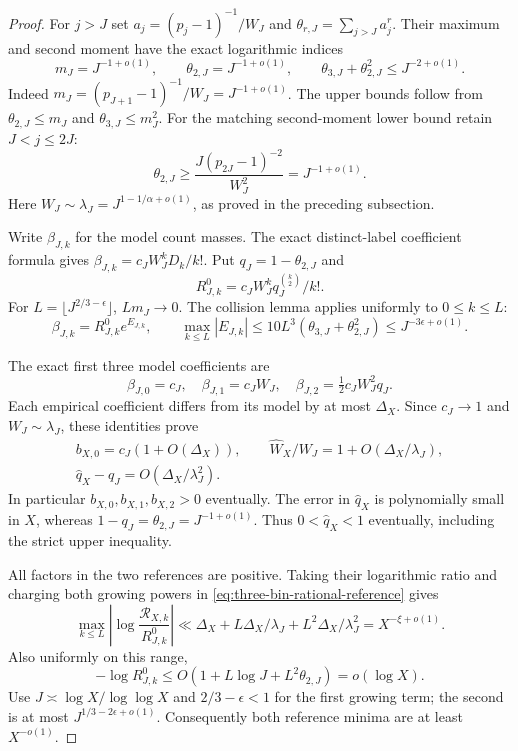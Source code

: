 \documentclass[11pt]{article}
\theoremstyle{definition}
\begin{document}
\begin{proof}
For $j>J$ set
$a_j=(p_j-1)^{-1}/W_J$ and
$\theta_{r,J}=\sum_{j>J}a_j^r$.
Their maximum and second moment have the exact logarithmic indices
\begin{equation}
 m_J=J^{-1+o(1)},\qquad
 \theta_{2,J}=J^{-1+o(1)},\qquad
 \theta_{3,J}+\theta_{2,J}^2\le J^{-2+o(1)}.
 \label{eq:three-bin-weight-indices}
\end{equation}
Indeed $m_J=(p_{J+1}-1)^{-1}/W_J=J^{-1+o(1)}$.
The upper bounds follow from
$\theta_{2,J}\le m_J$ and $\theta_{3,J}\le m_J^2$.
For the matching second-moment lower bound retain $J<j\le2J$:
\[
 \theta_{2,J}\ge
       \frac{J(p_{2J}-1)^{-2}}{W_J^2}=J^{-1+o(1)}.
\]
Here $W_J\sim\lambda_J=J^{1-1/\alpha+o(1)}$, as proved
in the preceding subsection.

Write $\beta_{J,k}$ for the model count masses.
The exact distinct-label coefficient formula gives
$\beta_{J,k}=c_JW_J^kD_k/k!$.
Put $q_J=1-\theta_{2,J}$ and
\[
 R^0_{J,k}=c_JW_J^kq_J^{\binom k2}/k!.
\]
For $L=\lfloor J^{2/3-\epsilon}\rfloor$,
$Lm_J\to0$.
The collision lemma applies uniformly to $0\le k\le L$:
\begin{equation}
 \beta_{J,k}=R^0_{J,k}e^{E_{J,k}},\qquad
 \max_{k\le L}|E_{J,k}|
       \le10L^3(\theta_{3,J}+\theta_{2,J}^2)
       \le J^{-3\epsilon+o(1)}.
 \label{eq:three-bin-model-consumer}
\end{equation}

The exact first three model coefficients are
\[
 \beta_{J,0}=c_J,\quad
 \beta_{J,1}=c_JW_J,\quad
 \beta_{J,2}=\tfrac12c_JW_J^2q_J.
\]
Each empirical coefficient differs from its model by at most
$\Delta_X$.  Since $c_J\to1$ and $W_J\sim\lambda_J$,
these identities prove
\begin{equation}
 \begin{gathered}
 b_{X,0}=c_J(1+O(\Delta_X)),\qquad
 \widehat W_X/W_J=1+O(\Delta_X/\lambda_J),\\
 \widehat q_X-q_J=O(\Delta_X/\lambda_J^2).
 \end{gathered}
 \label{eq:three-bin-parameter-transfer}
\end{equation}
In particular $b_{X,0},b_{X,1},b_{X,2}>0$ eventually.
The error in $\widehat q_X$ is polynomially small in $X$,
whereas $1-q_J=\theta_{2,J}=J^{-1+o(1)}$.
Thus $0<\widehat q_X<1$ eventually, including the strict
upper inequality.

All factors in the two references are positive.
Taking their logarithmic ratio and charging both growing powers
in \eqref{eq:three-bin-rational-reference} gives
\[
 \max_{k\le L}\left|\log\frac{\mathcal R_{X,k}}{R^0_{J,k}}\right|
 \ll \Delta_X
       +L\Delta_X/\lambda_J
       +L^2\Delta_X/\lambda_J^2
 =X^{-\xi+o(1)}.
\]
Also uniformly on this range,
\[
 -\log R^0_{J,k}
   \le O(1+L\log J+L^2\theta_{2,J})=o(\log X).
\]
Use $J\asymp\log X/\log\log X$ and $2/3-\epsilon<1$
for the first growing term; the second is at most
$J^{1/3-2\epsilon+o(1)}$.
Consequently both reference minima are at least $X^{-o(1)}$.


\end{proof}
\end{document}
